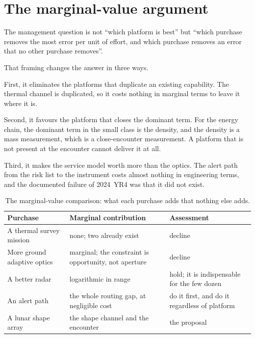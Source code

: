 \section{The marginal-value argument}

The management question is not ``which platform is best'' but ``which
purchase removes the most error per unit of effort, and which purchase
removes an error that no other purchase removes''.

That framing changes the answer in three ways.

First, it eliminates the platforms that duplicate an existing capability.
The thermal channel is duplicated, so it costs nothing in marginal terms to
leave it where it is.

Second, it favours the platform that closes the dominant term. For the
energy chain, the dominant term in the small class is the density, and the
density is a mass measurement, which is a close-encounter measurement. A
platform that is not present at the encounter cannot deliver it at all.

Third, it makes the service model worth more than the optics. The alert
path from the risk list to the instrument costs almost nothing in
engineering terms, and the documented failure of 2024~YR4 was that it did
not exist.

\begin{table}[!htbp]
\centering
\small
\caption{The marginal-value comparison: what each purchase adds that nothing
else adds.}
\label{tab:marginal}
\begin{tabularx}{\textwidth}{@{}P{1.36in}P{1.20in}Y@{}}
\toprule
{}
\textbf{Purchase} & \textbf{Marginal contribution} & \textbf{Assessment} \\
\midrule
A thermal survey mission & none; two already exist & decline \\
More ground adaptive optics & marginal; the constraint is opportunity, not
aperture & decline \\
A better radar & logarithmic in range & hold; it is indispensable for the
few dozen \\
An alert path & the whole routing gap, at negligible cost & do it first, and
do it regardless of platform \\
A lunar shape array & the shape channel and the encounter & the proposal \\
\bottomrule
\end{tabularx}
\end{table}

